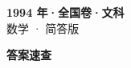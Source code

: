 \documentclass[zihao=-4, a4paper]{ctexart}
\begin{document}
\begin{center}
  {\Large\bfseries 1994 年·全国卷·文科}\\[4pt]
  {\large 数学 · 简答版}
\end{center}
\medskip
{}

\clearpage
{}
\begin{center}{\Large\bfseries 答案速查}\end{center}
\medskip

\end{document}
